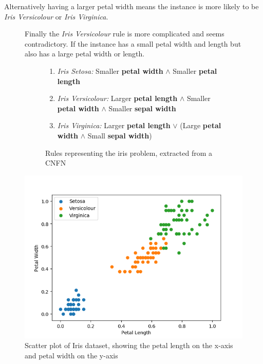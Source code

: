 Alternatively having a larger petal width means the instance is more likely to be \textit{Iris Versicolour} or \textit{Iris Virginica}.

\begin{figure}[H]
	\centering

	\begin{minipage}[p]{0.51\textwidth}
	 Finally the \textit{Iris Versicolour} rule is more complicated and seems contradictory. If the instance has a small petal width and length but also has a large petal width or length.
	 \begin{figure}[H]
	 	\begin{enumerate}
	 		\item \textit{Iris Setosa: } Smaller \textbf{petal width} $\land$ Smaller \textbf{petal length}
	 		\item \textit{Iris Versicolour: } Larger \textbf{petal length} $\land$ Smaller \textbf{petal width} $\land$ Smaller \textbf{sepal width}
	 		\item \textit{Iris Virginica: } Larger \textbf{petal length} $\lor$ (Large \textbf{petal width} $\land$ Small \textbf{sepal width})
	 	\end{enumerate}
 		\caption{Rules representing the iris problem, extracted from a CNFN}
 		\label{fig:iris-rules}
	 \end{figure}
	\end{minipage}
	\hspace{4px}
	\begin{minipage}[p]{0.45\textwidth}
		\includegraphics[width=\textwidth]{IrisData(petal(length-vs-width)).png}
		\caption{Scatter plot of Iris dataset, showing the petal length on the x-axis and petal width on the y-axis}
		\label{fig:iris-data-petal-length-vs-width}
	\end{minipage}
	\hfill
\end{figure}

